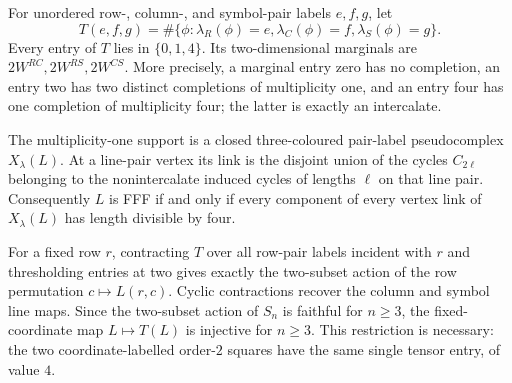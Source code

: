 \begin{proposition}
\label{prop:pair-label-tensor}
For unordered row-, column-, and symbol-pair labels $e,f,g$, let
\[
 T(e,f,g)=\#\{\phi:\lambda_R(\phi)=e,
 \lambda_C(\phi)=f,\lambda_S(\phi)=g\}.
\]
Every entry of $T$ lies in $\{0,1,4\}$.  Its two-dimensional marginals are
$2W^{RC},2W^{RS},2W^{CS}$.  More precisely, a marginal entry zero has no
completion, an entry two has two distinct completions of multiplicity one,
and an entry four has one completion of multiplicity four; the latter is
exactly an intercalate.

The multiplicity-one support is a closed three-coloured pair-label
pseudocomplex $X_\lambda(L)$.  At a line-pair vertex its link is the disjoint
union of the cycles $C_{2\ell}$ belonging to the nonintercalate induced
cycles of lengths $\ell$ on that line pair.  Consequently $L$ is FFF if and
only if every component of every vertex link of $X_\lambda(L)$ has length
divisible by four.

For a fixed row $r$, contracting $T$ over all row-pair labels incident with
$r$ and thresholding entries at two gives exactly the two-subset action of
the row permutation $c\mapsto L(r,c)$.  Cyclic contractions recover the
column and symbol line maps.  Since the two-subset action of $S_n$ is
faithful for $n\geq3$, the fixed-coordinate map $L\mapsto T(L)$ is injective
for $n\geq3$.  This restriction is necessary: the two coordinate-labelled
order-$2$ squares have the same single tensor entry, of value $4$.
\end{proposition}

